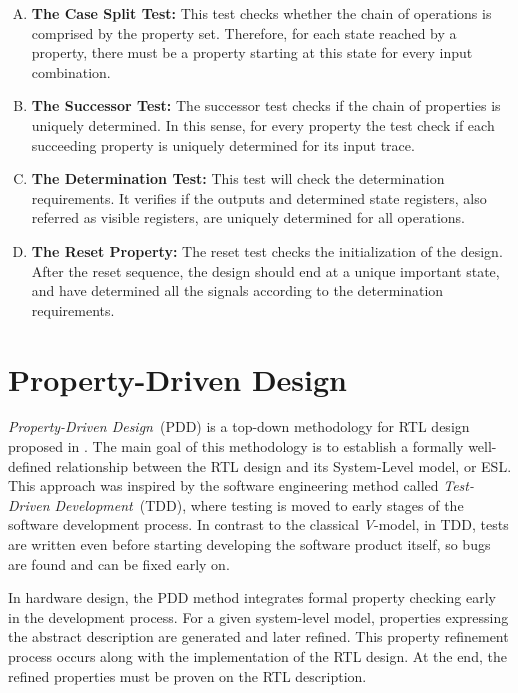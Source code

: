\begin{enumerate}[A.]
    \item \textbf{The Case Split Test:} This test checks whether the chain of operations is comprised by the property set. Therefore, for each state reached by a property, there must be a property starting at this state for every input combination.
    \item \textbf{The Successor Test:} The successor test checks if the chain of properties is uniquely determined. In this sense, for every property the test check if each succeeding property is uniquely determined for its input trace.
    \item \textbf{The Determination Test:} This test will check the determination requirements. It verifies if the outputs and determined state registers, also referred as visible registers, are uniquely determined for all operations.
    \item \textbf{The Reset Property:} The reset test checks the initialization of the design. After the reset sequence, the design should end at a unique important state, and have determined all the signals according to the determination requirements.
\end{enumerate}


\section{Property-Driven Design}
\label{section:PDD}

\textit{Property-Driven Design}~(PDD) is a top-down methodology for RTL design proposed in \cite{paper-pdd}. The main goal of this methodology is to establish a formally well-defined relationship between the RTL design and its System-Level model, or ESL. This approach was inspired by the software engineering method called \textit{Test-Driven Development}~(TDD), where testing is moved to early stages of the software development process. In contrast to the classical \textit{V}-model, in TDD, tests are written even before starting developing the software product itself, so bugs are found and can be fixed early on. 

In hardware design, the PDD method integrates formal property checking early in the development process. For a given system-level model, properties expressing the abstract description are generated and later refined. This property refinement process occurs along with the implementation of the RTL design. At the end, the refined properties must be proven on the RTL description.

